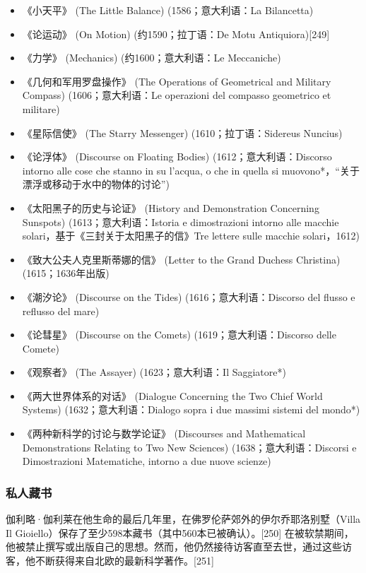\begin{itemize}
\item 《小天平》 (The Little Balance) (1586；意大利语：La Bilancetta)  
\item 《论运动》 (On Motion) (约1590；拉丁语：De Motu Antiquiora)[249]  
\item 《力学》 (Mechanics) (约1600；意大利语：Le Meccaniche)  
\item 《几何和军用罗盘操作》 (The Operations of Geometrical and Military Compass) (1606；意大利语：Le operazioni del compasso geometrico et militare)  
\item 《星际信使》 (The Starry Messenger) (1610；拉丁语：Sidereus Nuncius)  
\item 《论浮体》 (Discourse on Floating Bodies) (1612；意大利语：Discorso intorno alle cose che stanno in su l'acqua, o che in quella si muovono*，“关于漂浮或移动于水中的物体的讨论”)  
\item 《太阳黑子的历史与论证》 (History and Demonstration Concerning Sunspots) (1613；意大利语：Istoria e dimostrazioni intorno alle macchie solari，基于《三封关于太阳黑子的信》Tre lettere sulle macchie solari，1612)  
\item 《致大公夫人克里斯蒂娜的信》 (Letter to the Grand Duchess Christina) (1615；1636年出版)  
\item 《潮汐论》 (Discourse on the Tides) (1616；意大利语：Discorso del flusso e reflusso del mare)  
\item 《论彗星》 (Discourse on the Comets) (1619；意大利语：Discorso delle Comete)  
\item 《观察者》 (The Assayer) (1623；意大利语：Il Saggiatore*)  
\item 《两大世界体系的对话》 (Dialogue Concerning the Two Chief World Systems) (1632；意大利语：Dialogo sopra i due massimi sistemi del mondo*)  
\item 《两种新科学的讨论与数学论证》 (Discourses and Mathematical Demonstrations Relating to Two New Sciences) (1638；意大利语：Discorsi e Dimostrazioni Matematiche, intorno a due nuove scienze)  
\end{itemize}
\subsubsection{私人藏书}  
伽利略·伽利莱在他生命的最后几年里，在佛罗伦萨郊外的伊尔乔耶洛别墅（Villa Il Gioiello）保存了至少598本藏书（其中560本已被确认）。[250] 在被软禁期间，他被禁止撰写或出版自己的思想。然而，他仍然接待访客直至去世，通过这些访客，他不断获得来自北欧的最新科学著作。[251]  

